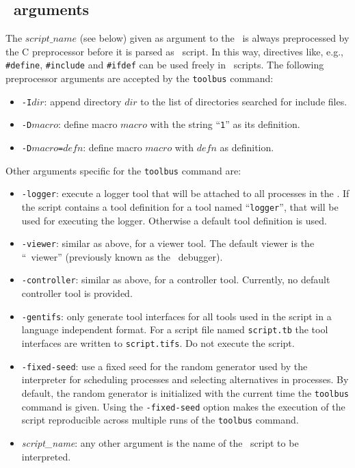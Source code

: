 \subsection{\label{TB-args}\TB\ arguments}
The $script\_name$ (see below) given as argument to the \TB\ is always
preprocessed by the C preprocessor before it is parsed as \T\ script.
In this way, directives like, e.g., {\tt \#define}, {\tt \#include} and
{\tt \#ifdef} can be used freely in \T\ scripts. The following
preprocessor arguments are accepted by the {\tt toolbus} command:

\begin{itemize}

\item {\tt -I$dir$}: append directory $dir$ to the list of directories
searched for include files.

\item {\tt -D$macro$}: define macro $macro$ with the string ``{\tt 1}'' as
its definition.

\item {\tt -D$macro$=$defn$}: define macro $macro$ with $defn$
as definition.

\end{itemize}

\noindent Other arguments specific for the {\tt toolbus} command are:
\begin{itemize}
\item {\tt -logger}: execute a logger tool that will be attached to all
processes in the \TB.
If the script contains a tool definition for a tool named ``{\tt logger}'',
that will be used for executing the logger. Otherwise a default tool definition
is used.
\item {\tt -viewer}: similar as above, for a viewer tool.
The default viewer is the ``\TB\ viewer'' (previously known
as the \TB\ debugger).

\item {\tt -controller}: similar as above, for a controller tool.
Currently, no default controller tool is provided.

\item {\tt -gentifs}: only generate tool interfaces 
for all tools used in the script
in a language independent format. For a script file named {\tt script.tb}
the tool interfaces are written to {\tt script.tifs}.
Do not execute the script.

\item {\tt -fixed-seed}: use a fixed seed for the random generator
used by the interpreter for scheduling processes and selecting
alternatives in processes.  By default, the random generator is
initialized with the current time the {\tt toolbus} command is given.
Using the {\tt -fixed-seed} option makes the execution of the script
reproducible across multiple runs of the {\tt toolbus} command.

\item {\em script\_name}: any other argument is the name of the
\TB\ script to be interpreted.
\end{itemize}

